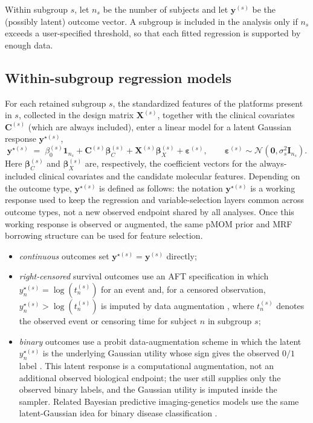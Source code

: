 \documentclass[article]{jss}
\begin{document}
Within subgroup $s$, let $n_s$ be the number of subjects and let
$\bm{y}^{(s)}$ be the (possibly latent) outcome vector. A subgroup is included
in the analysis only if $n_s$ exceeds a user-specified threshold, so that each
fitted regression is supported by enough data.

\subsection{Within-subgroup regression models}\label{sec:regression}

For each retained subgroup $s$, the standardized features of the platforms
present in $s$, collected in the design matrix $\bm{X}^{(s)}$, together with the
clinical covariates $\bm{C}^{(s)}$ (which are always included), enter a linear
model for a latent Gaussian response $\bm{y}^{\star(s)}$,
%
\begin{equation}\label{eq:linear}
  \bm{y}^{\star(s)} \;=\; \beta_0^{(s)}\bm{1}_{n_s}
  + \bm{C}^{(s)}\bm{\beta}_{C}^{(s)}
  + \bm{X}^{(s)}\bm{\beta}_{X}^{(s)} + \bm{\varepsilon}^{(s)},
  \qquad \bm{\varepsilon}^{(s)}\sim\mathcal{N}\!\left(\bm{0},\sigma_s^{2}\bm{I}_{n_s}\right).
\end{equation}
%
Here $\bm{\beta}_{C}^{(s)}$ and $\bm{\beta}_{X}^{(s)}$ are, respectively, the
coefficient vectors for the always-included clinical covariates and the
candidate molecular features. Depending on the outcome type,
$\bm{y}^{\star(s)}$ is defined as follows:
the notation $\bm{y}^{\star(s)}$ is a working response used to keep the
regression and variable-selection layers common across outcome types, not a new
observed endpoint shared by all analyses.  Once this working response is
observed or augmented, the same pMOM prior and MRF borrowing structure can be
used for feature selection.
%
\begin{itemize}
\item \emph{continuous} outcomes set $\bm{y}^{\star(s)}=\bm{y}^{(s)}$ directly;
\item \emph{right-censored} survival outcomes use an AFT specification in which
  $y^{\star(s)}_n=\log(t^{(s)}_n)$ for an event and, for a censored observation,
  $y^{\star(s)}_n>\log(t^{(s)}_n)$ is imputed by data augmentation
  \citep{tanner1987}, where $t^{(s)}_n$ denotes the observed event or censoring
  time for subject $n$ in subgroup $s$;
\item \emph{binary} outcomes use a probit data-augmentation scheme in which the
  latent $y^{\star(s)}_n$ is the underlying Gaussian utility whose sign gives the
  observed $0/1$ label \citep{albert1993}. This latent response is a
  computational augmentation, not an additional observed biological endpoint;
  the user still supplies only the observed binary labels, and the Gaussian
  utility is imputed inside the sampler.  Related Bayesian predictive
  imaging-genetics models use the same latent-Gaussian idea for binary disease
  classification
  \citep{chekouo2016aoas}.
\end{itemize}
\end{document}
